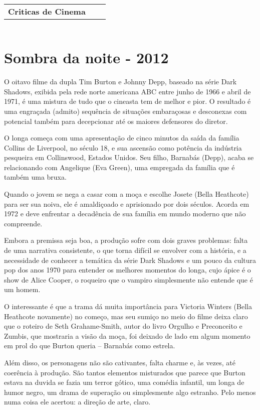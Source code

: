 \documentclass[a4paper,11pt,openright,openbib]{article}
\title{
\begin{center}
	\begin{tabular}{l c r}
	\Large{\textbf{Criticas de Cinema}} & \\
	\end{tabular}
	\end{center}
}
\begin{document}
\maketitle

\pagestyle{headings}
\newpage
\tableofcontents
\newpage

\section{Sombra da noite - 2012}

O oitavo filme da dupla Tim Burton e Johnny Depp, baseado na série Dark Shadows, exibida pela rede norte americana ABC entre junho de 1966 e abril de 1971, é uma mistura de tudo que o cineasta tem de melhor e pior. O resultado é uma engraçada (admito) sequência de situações embaraçosas e desconexas com potencial também para decepcionar até os maiores defensores do diretor.

O longa começa com uma apresentação de cinco minutos da saída da família Collins de Liverpool, no século 18, e sua ascensão como potência da indústria pesqueira em Collinswood, Estados Unidos. Seu filho, Barnabás (Depp), acaba se relacionando com Angelique (Eva Green), uma empregada da família que é também uma bruxa. 

Quando o jovem se nega a casar com a moça e escolhe Josete (Bella Heathcote) para ser sua noiva, ele é amaldiçoado e aprisionado por dois séculos. Acorda em 1972 e deve enfrentar a decadência de sua família em mundo moderno que não compreende. 

Embora a premissa seja boa, a produção sofre com dois graves problemas: falta de uma narrativa consistente, o que torna difícil se envolver com a história, e a necessidade de conhecer a temática da série Dark Shadows e um pouco da cultura pop dos anos 1970 para entender os melhores momentos do longa, cujo ápice é o show de Alice Cooper, o roqueiro que o vampiro simplesmente não entende que é um homem.

O interessante é que a trama dá muita importância para Victoria Winters (Bella Heathcote novamente) no começo, mas seu sumiço no meio do filme deixa claro que o roteiro de Seth Grahame-Smith, autor do livro Orgulho e Preconceito e Zumbis, que mostraria a visão da moça, foi deixado de lado em algum momento em prol do que Burton queria – Barnabás como estrela. 

Além disso, os personagens não são cativantes, falta charme e, às vezes, até coerência à produção. São tantos elementos misturados que parece que Burton estava na duvida se fazia um terror gótico, uma comédia infantil, um longa de humor negro, um drama de superação ou simplesmente algo estranho. Pelo menos numa coisa ele acertou: a direção de arte, claro.
\end{document}
